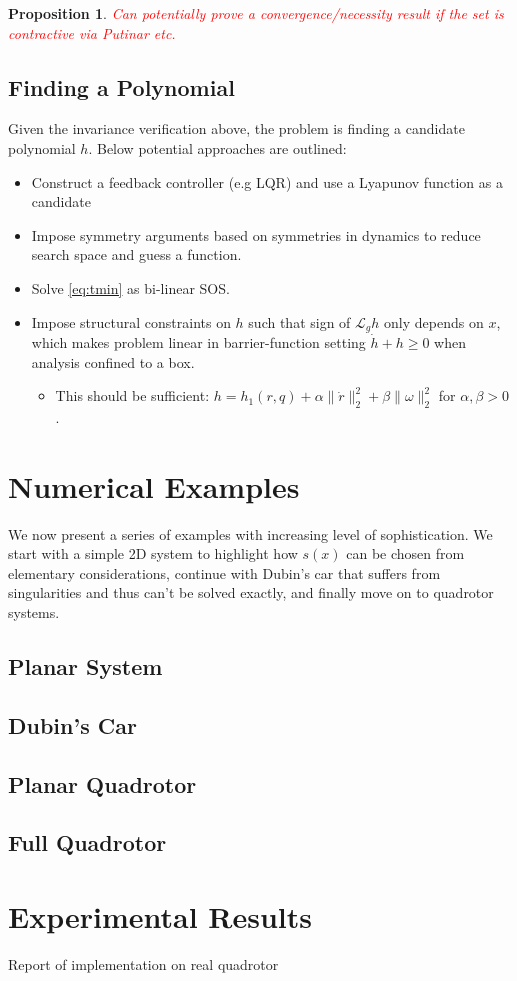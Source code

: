 \documentclass[conference]{IEEEtran}
\newtheorem{prop}{Proposition}
\begin{document}
\begin{prop}
	\textcolor{red}{Can potentially prove a convergence/necessity result if the set is \emph{contractive} \cite{Ames2017} via Putinar etc.}
\end{prop}



\subsection{Finding a Polynomial}

Given the invariance verification above, the problem is finding a candidate polynomial $h$. Below potential approaches are outlined:
\begin{itemize}
   \item Construct a feedback controller (e.g LQR) and use a Lyapunov function as a candidate
   \item Impose symmetry arguments based on symmetries in dynamics to reduce search space and guess a function.
   \item Solve \eqref{eq:tmin} as bi-linear SOS.
   \item Impose structural constraints on $h$ such that sign of $\mathcal L_g h$ only depends on $x$, which makes problem linear in barrier-function setting $\dot h + h \geq 0$ when analysis confined to a box.
   \begin{itemize}
     \item This should be sufficient: $h = h_1(r,q) + \alpha \| \dot r \|^2_2 + \beta \| \omega \|_2^2$ for $\alpha, \beta > 0$.
   \end{itemize} 
\end{itemize} 

\section{Numerical Examples}

We now present a series of examples with increasing level of sophistication. We start with a simple 2D system to highlight how $s(x)$ can be chosen from elementary considerations, continue with Dubin's car that suffers from singularities and thus can't be solved exactly, and finally move on to quadrotor systems.

\subsection{Planar System}

\subsection{Dubin's Car}

\subsection{Planar Quadrotor}

\subsection{Full Quadrotor}


\section{Experimental Results}

Report of implementation on real quadrotor

\printbibliography 
\end{document}

